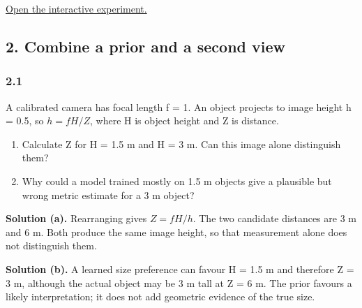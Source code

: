 \documentclass[11pt,a4paper]{article}
\begin{document}
\par\medskip
\noindent\href{https://sosekie.github.io/Unibe-CVG-CV-Interactive-Labs/tutorial-10/#ambiguity}{Open the interactive experiment.}
\subsection*{2. Combine a prior and a second view}
\par
\noindent
\begin{minipage}{\linewidth}
\subsubsection*{2.1}
A calibrated camera has focal length f = 1.
An object projects to image height h = 0.5, so $h=fH/Z$, where H is object height and Z is distance.
\begin{enumerate}[label=(\alph*),nosep]
\item Calculate Z for H = 1.5 m and H = 3 m.
Can this image alone distinguish them?
\item Why could a model trained mostly on 1.5 m objects give a plausible but wrong metric estimate for a 3 m object?
\end{enumerate}
\noindent\textbf{Solution (a).} Rearranging gives $Z=fH/h$.
The two candidate distances are 3 m and 6 m.
Both produce the same image height, so that measurement alone does not distinguish them.

\noindent\textbf{Solution (b).} A learned size preference can favour H = 1.5 m and therefore Z = 3 m, although the actual object may be 3 m tall at Z = 6 m.
The prior favours a likely interpretation; it does not add geometric evidence of the true size.
\end{minipage}
\par\medskip
\par
\noindent
\end{document}
